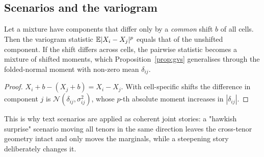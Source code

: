 \subsection{Scenarios and the variogram}

\begin{proposition}
Let a mixture have components that differ only by a \emph{common} shift $b$ of all cells. Then the variogram statistic
$\mathbb{E}|X_i-X_j|^p$ equals that of the unshifted component. If the shift differs across cells, the pairwise statistic becomes a mixture of shifted
moments, which Proposition~\ref{prop:gvs} generalises through the folded-normal moment with non-zero mean $\delta_{ij}$.
\end{proposition}
\begin{proof}
$X_i+b-(X_j+b)=X_i-X_j$. With cell-specific shifts the difference in component $j$ is $\mathcal N(\delta_{ij},\sigma_{ij}^2)$, whose $p$-th absolute
moment increases in $|\delta_{ij}|$.
\end{proof}
This is why text scenarios are applied as coherent joint stories: a "hawkish surprise" scenario moving all tenors in the same direction leaves the
cross-tenor geometry intact and only moves the marginals, while a steepening story deliberately changes it.
